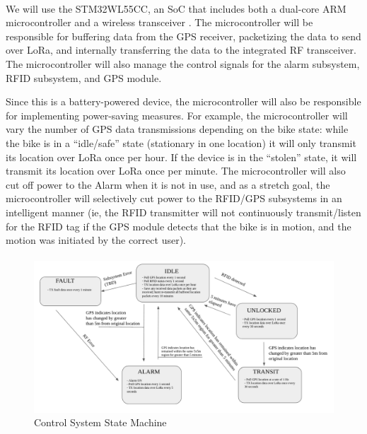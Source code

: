 \documentclass{article}
\begin{document}
\paragraph{}
We will use the STM32WL55CC, an SoC that includes both a dual-core ARM microcontroller and a wireless transceiver \cite{stm_datasheet}. The microcontroller will be responsible for buffering data from the GPS receiver, packetizing the data to send over LoRa, and internally transferring the data to the integrated RF transceiver. The microcontroller will also manage the control signals for the alarm subsystem, RFID subsystem, and GPS module. 

Since this is a battery-powered device, the microcontroller will also be responsible for implementing power-saving measures. For example, the microcontroller will vary the number of GPS data transmissions depending on the bike state: while the bike is in a “idle/safe” state (stationary in one location) it will only transmit its location over LoRa once per hour. If the device is in the “stolen” state, it will transmit its location over LoRa once per minute. The microcontroller will also cut off power to the Alarm when it is not in use, and as a stretch goal, the microcontroller will selectively cut power to the RFID/GPS subsystems in an intelligent manner (ie, the RFID transmitter will not continuously transmit/listen for the RFID tag if the GPS module detects that the bike is in motion, and the motion was initiated by the correct user). 
\paragraph{} 

\begin{figure}[H]
	\begin{centering}
	\includegraphics[width=\textwidth]{state.png}
	\caption{Control System State Machine}\label{state}
	\end{centering}
\end{figure}
\end{document}
